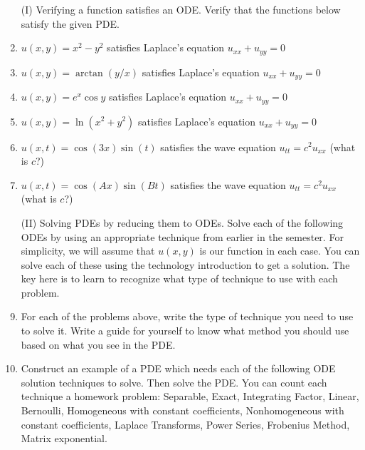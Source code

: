\begin{enumerate}
	\item[(I)] Verifying a function satisfies an ODE.  Verify that the functions below satisfy the given PDE.
	\item $u(x,y) = x^2-y^2$ satisfies Laplace's equation $u_{xx}+u_{yy}=0$
	\item $u(x,y)= \arctan(y/x)$ satisfies Laplace's equation $u_{xx}+u_{yy}=0$
	\item $u(x,y)=e^x\cos y$ satisfies Laplace's equation $u_{xx}+u_{yy}=0$
	\item $u(x,y)=\ln(x^2+y^2)$ satisfies Laplace's equation $u_{xx}+u_{yy}=0$
	\item $u(x,t)=\cos(3x)\sin(t)$ satisfies the wave equation $u_{tt}  = c^2u_{xx}$ (what is $c$?)
	\item $u(x,t)=\cos(Ax)\sin(Bt)$ satisfies the wave equation $u_{tt}  = c^2u_{xx}$ (what is $c$?)

  \item[(II)] Solving PDEs by reducing them to ODEs.  Solve each of the following ODEs by using an appropriate technique from earlier in the semester. For simplicity, we will assume that $u(x,y)$ is our function in each case. You can solve each of these using the technology introduction to get a solution.  The key here is to learn to recognize what type of technique to use with each problem.
	\item For each of the problems above, write the type of technique you need to use to solve it. Write a guide for yourself to know what method you should use based on what you see in the PDE.
	\item Construct an example of a PDE which needs each of the following ODE solution techniques to solve. Then solve the PDE.  You can count each technique a homework problem:
	Separable, 
	Exact,
	Integrating Factor,
	Linear,
	 Bernoulli,
	 Homogeneous with constant coefficients,
	 Nonhomogeneous with constant coefficients,
	 Laplace Transforms,
	 Power Series,
	 Frobenius Method,
	 Matrix exponential.




\end{enumerate}
